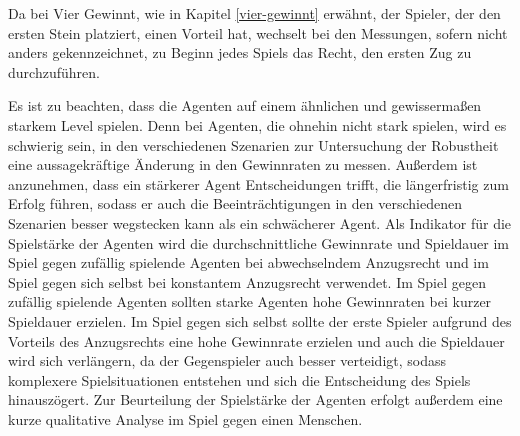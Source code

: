 


Da bei Vier Gewinnt, wie in Kapitel \ref{vier-gewinnt} erwähnt, der Spieler, der den ersten Stein platziert, einen Vorteil hat, wechselt bei den Messungen, sofern nicht anders gekennzeichnet, zu Beginn jedes Spiels das Recht, den ersten Zug zu durchzuführen.

Es ist zu beachten, dass die Agenten auf einem ähnlichen und gewissermaßen starkem Level spielen. Denn bei Agenten, die ohnehin nicht stark spielen, wird es schwierig sein, in den verschiedenen Szenarien zur Untersuchung der Robustheit eine aussagekräftige Änderung in den Gewinnraten zu messen. Außerdem ist anzunehmen, dass ein stärkerer Agent Entscheidungen trifft, die längerfristig zum Erfolg führen, sodass er auch die Beeinträchtigungen in den verschiedenen Szenarien besser wegstecken kann als ein schwächerer Agent. Als Indikator für die Spielstärke der Agenten wird die durchschnittliche Gewinnrate und Spieldauer im Spiel gegen zufällig spielende Agenten bei abwechselndem Anzugsrecht und im Spiel gegen sich selbst bei konstantem Anzugsrecht verwendet. Im Spiel gegen zufällig spielende Agenten sollten starke Agenten hohe Gewinnraten bei kurzer Spieldauer erzielen. Im Spiel gegen sich selbst sollte der erste Spieler aufgrund des Vorteils des Anzugsrechts eine hohe Gewinnrate erzielen und auch die Spieldauer wird sich verlängern, da der Gegenspieler auch besser verteidigt, sodass komplexere Spielsituationen entstehen und sich die Entscheidung des Spiels hinauszögert. Zur Beurteilung der Spielstärke der Agenten erfolgt außerdem eine kurze qualitative Analyse im Spiel gegen einen Menschen.
